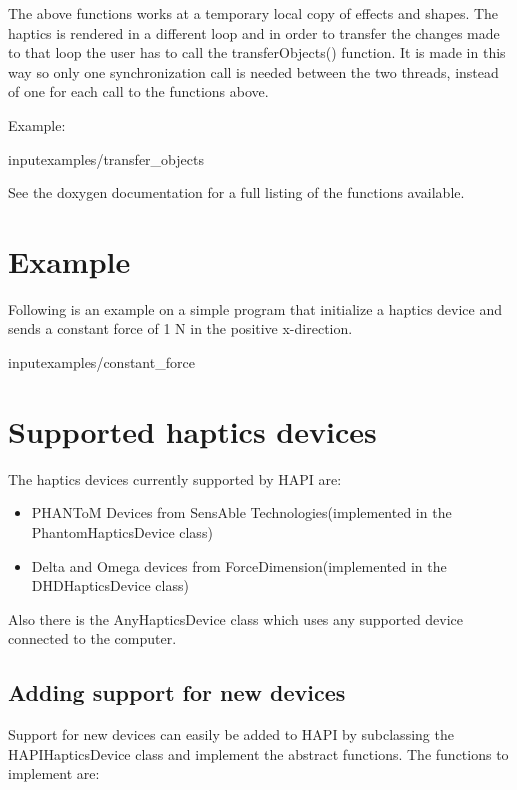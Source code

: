 The above functions works at a temporary local copy of effects and
shapes. The haptics is rendered in a different loop and in order to
transfer the changes made to that loop the user has to call the
transferObjects() function. It is made in this way so only one
synchronization call is needed between the two threads, instead of one
for each call to the functions above.

Example:

input{examples/transfer_objects}

See the doxygen documentation for a full listing of the functions
available. 

\section{Example}
Following is an example on a simple program that initialize a haptics
device and sends a constant force of 1 N in the positive x-direction.

input{examples/constant_force} 

\section{Supported haptics devices}
The haptics devices currently supported by HAPI are:

\begin{itemize}
\item PHANToM Devices from SensAble Technologies(implemented in the
  PhantomHapticsDevice class)
\item Delta and Omega devices from ForceDimension(implemented in the
  DHDHapticsDevice class)
\end{itemize}

Also there is the AnyHapticsDevice class which uses any supported
device connected to the computer.

\subsection{Adding support for new devices}

Support for new devices can easily be added to HAPI by subclassing the
HAPIHapticsDevice class and implement the abstract functions. The
functions to implement are:

